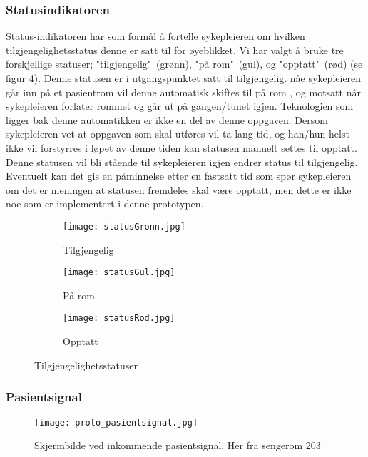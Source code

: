 \subsubsection{Statusindikatoren}
Status-indikatoren har som formål å fortelle sykepleieren om hvilken tilgjengelighetsstatus denne er satt til for øyeblikket. Vi har valgt å bruke tre forskjellige statuser; "tilgjengelig"\ (grønn), "på rom"\ (gul), og "opptatt"\ (rød) (se figur \ref{tilgjengelighetsstatuser}). Denne statusen er i utgangspunktet satt til tilgjengelig. nåe sykepleieren går inn på et pasientrom vil denne automatisk skiftes til på rom , og motsatt når sykepleieren forlater rommet og går ut på gangen/tunet igjen. Teknologien som ligger bak denne automatikken er ikke en del av denne oppgaven. Dersom sykepleieren vet at oppgaven som skal utføres vil ta lang tid, og han/hun helst ikke vil forstyrres i løpet av denne tiden kan statusen manuelt settes til opptatt. Denne statusen vil bli stående til sykepleieren igjen endrer status til tilgjengelig. Eventuelt kan det gis en påminnelse etter en fastsatt tid som spør sykepleieren om det er meningen at statusen fremdeles skal være opptatt, men dette er ikke noe som er implementert i denne prototypen.

\begin{figure}[H]
	\centering
	\begin{subfigure}[b]{0.3\textwidth}
		\texttt{[image: statusGronn.jpg]}
		\caption{Tilgjengelig}
		\label{proto_startside}
	\end{subfigure}
	\begin{subfigure}[b]{0.3\textwidth}
		\texttt{[image: statusGul.jpg]}
		\caption{På rom}
		\label{proto_startside}
	\end{subfigure}
	\begin{subfigure}[b]{0.3\textwidth}
		\texttt{[image: statusRod.jpg]}
		\caption{Opptatt}
		\label{proto_startside_medMeny}
	\end{subfigure}
	\caption{Tilgjengelighetsstatuser}
	\label{tilgjengelighetsstatuser}
\end{figure}

\subsubsection{Pasientsignal}

\begin{figure}
\centering
\texttt{[image: proto\_pasientsignal.jpg]}
\caption{Skjermbilde ved inkommende pasientsignal. Her fra sengerom 203}
\label{protoPasientsignal}
\end{figure}

